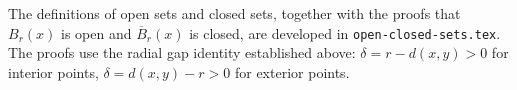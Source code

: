 \begin{remark*}
The definitions of open sets and closed sets, together with the proofs
that $B_r(x)$ is open and $\overline{B}_r(x)$ is closed, are developed
in \texttt{open-closed-sets.tex}.
The proofs use the radial gap identity established above:
$\delta = r - d(x,y) > 0$ for interior points,
$\delta = d(x,y) - r > 0$ for exterior points.
\end{remark*}
